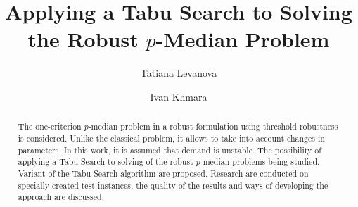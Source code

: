 \begin{englishtitle} %
\title{Applying a Tabu Search to Solving the Robust $p$-Median Problem}
\author{Tatiana Levanova  \and   Ivan Khmara
 }


\maketitle

\begin{abstract}
The one-criterion  $p$-median problem in a robust formulation using threshold robustness is considered. Unlike the classical problem, it allows to take into account changes in parameters. In this work, it is assumed that demand is unstable. The possibility of applying a Tabu Search  to solving of the robust $p$-median problems being studied. Variant of the Tabu Search algorithm  are proposed. Research are conducted on specially created test instances, the quality of the results and ways of developing the approach are discussed.

\end{abstract}
\end{englishtitle}

\iffalse
%
%


\documentclass[12pt]{llncs}  


\usepackage{iftex}

\ifPDFTeX
\usepackage[T2A]{fontenc}
\usepackage[utf8]{inputenc} %
\usepackage[english,russian]{babel}
\fi

\usepackage{todonotes} 

